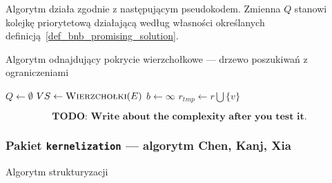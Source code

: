 \par{
  Algorytm działa zgodnie z następującym pseudokodem.
  Zmienna $Q$ stanowi kolejkę priorytetową działającą według własności określanych definicją~\ref{def_bnb_promising_solution}.
  \begin{algorithm}
    \caption{Algorytm odnajdujący pokrycie wierzchołkowe --- drzewo poszukiwań z ograniczeniami}\label{alg_VC2}
    \begin{algorithmic}[1]



        \State $Q \gets \emptyset$
        \State $VS \gets \Call{Wierzchołki}{E}$
        \State $b \gets \infty$
            \EndIf
            \Else
              \label{bnb_forLoop}
                \EndIf
                \State$r_{tmp} \gets r \bigcup \{v\}$
                \EndIf
              \EndFor
            \EndIf
          \EndIf
        \EndWhile
      \EndFunction
    \end{algorithmic}
  \end{algorithm}
  \[
    \textbf{TODO: Write about the complexity after you test it.}
  \]

\subsubsection{\textbf{Pakiet \texttt{kernelization} --- algorytm Chen, Kanj, Xia}}
\label{sss_internals_ckx}
\begin{algorithm}
  \caption{Algorytm strukturyzacji}\label{alg_ckx_struction}
  \begin{algorithmic}[1]


\end{algorithmic}
\end{algorithm}}
